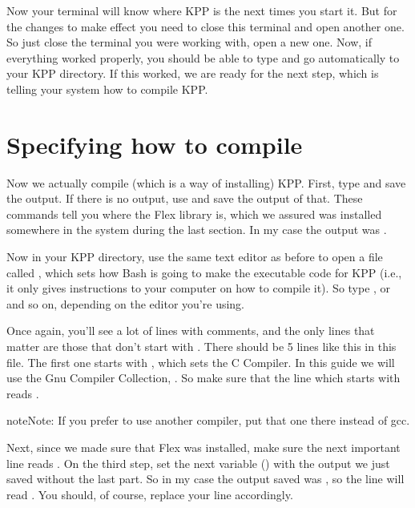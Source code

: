 \documentclass[letterpaper,10pt,openany,oneside]{sphinxmanual}
\begin{document}
Now your terminal will know where KPP is the next times you start it. But for
the changes to make effect you need to close this terminal and open another
one. So just close the terminal you were working with, open a new one. Now, if
everything worked properly, you should be able to type  and go
automatically to your KPP directory. If this worked, we are ready for the next
step, which is telling your system how to compile KPP.


\section{Specifying how to compile}
\label{compiling:specifying-how-to-compile}
Now we actually compile (which is a way of installing) KPP. First, type
 and save the output. If there is no output, use  and save the output of that. These commands tell you where the Flex
library is, which we assured was installed somewhere in the system during the
last section. In my case the output was .

Now in your KPP directory, use the same text editor as before to open a file
called , which sets how Bash is going to make the executable
code for KPP (i.e., it only gives instructions to your computer on how to
compile it). So type , or  and so
on, depending on the editor you're using.

Once again, you'll see a lot of lines with comments, and the only lines that
matter are those that don't start with \sphinxcode{\#}. There should be 5 lines like this
in this file. The first one starts with , which sets the C Compiler. In
this guide we will use the Gnu Compiler Collection, . So make sure that
the line which starts with  reads .

\begin{notice}{note}{Note:}
If you prefer to use another compiler, put that one there instead of gcc.
\end{notice}

Next, since we made sure that Flex was installed, make sure the next important
line reads . On the third step, set the next variable
() with the output we just saved without the last part. So in
my case the output saved was , so the line
will read . You should, of course,
replace your line accordingly.
\end{document}
